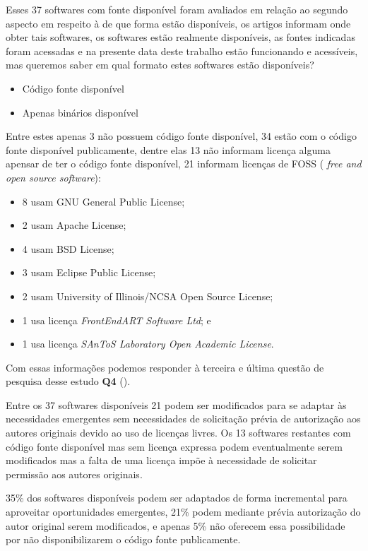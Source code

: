 Esses 37 softwares com fonte disponível foram avaliados em relação ao segundo
aspecto em respeito à de que forma estão disponíveis, os artigos informam onde
obter tais softwares, os softwares estão realmente disponíveis, as fontes
indicadas foram acessadas e na presente data deste trabalho estão funcionando e
acessíveis, mas queremos saber em qual formato estes softwares estão
disponíveis?

\begin{itemize}
  \item Código fonte disponível
  \item Apenas binários disponível
\end{itemize}

Entre estes apenas 3 não possuem código fonte disponível, 34 estão com o código
fonte disponível publicamente, dentre elas 13 não informam licença alguma
apensar de ter o código fonte disponível, 21 informam licenças de FOSS ({\it
free and open source software}):

\begin{itemize}
  \item 8 usam GNU General Public License;
  \item 2 usam Apache License;
  \item 4 usam BSD License;
  \item 3 usam Eclipse Public License;
  \item 2 usam University of Illinois/NCSA Open Source License;
  \item 1 usa licença {\it FrontEndART Software Ltd}; e
  \item 1 usa licença {\it SAnToS Laboratory Open Academic License}.
\end{itemize}

Com essas informações podemos responder à terceira e última questão de
pesquisa desse estudo {\bf Q4} (\QuestaoQuatro).

Entre os 37 softwares disponíveis 21 podem ser modificados para se adaptar às
necessidades emergentes sem necessidades de solicitação prévia de autorização
aos autores originais devido ao uso de licenças livres. Os 13 softwares
restantes com código fonte disponível mas sem licença expressa podem
eventualmente serem modificados mas a falta de uma licença impõe à necessidade
de solicitar permissão aos autores originais.

35\% dos softwares disponíveis podem ser adaptados de forma incremental para
aproveitar oportunidades emergentes, 21\% podem mediante prévia autorização do
autor original serem modificados, e apenas 5\% não oferecem essa possibilidade
por não disponibilizarem o código fonte publicamente.

